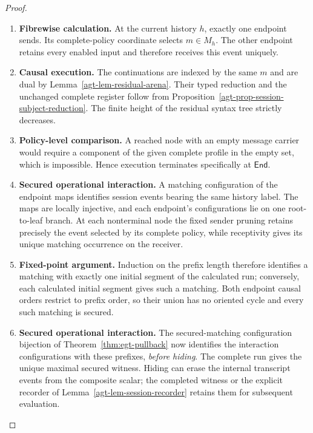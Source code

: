 \documentclass[11pt,a4paper]{article}
\numberwithin{equation}{section}
\theoremstyle{definition}
\theoremstyle{remark}
\theoremstyle{plain}
\providecommand{\End}{\mathsf{End}}
\begin{document}
\begin{proof}
\leavevmode
\begin{enumerate}[label=\textup{(\arabic*)},leftmargin=*,itemsep=4pt,topsep=3pt]
  \item \textbf{Fibrewise calculation.} At the current history $h$, exactly one endpoint sends. Its complete-policy
coordinate selects $m\in M_h$. The other endpoint retains every enabled
input and therefore receives this event uniquely.
  \item \textbf{Causal execution.} The continuations
are indexed by the same $m$ and are dual by
Lemma~\ref{agt-lem-residual-arena}. Their typed reduction and the
unchanged complete register follow from
Proposition~\ref{agt-prop-session-subject-reduction}. The finite height
of the residual syntax tree strictly decreases.
  \item \textbf{Policy-level comparison.} A reached node with an
empty message carrier would
require a component of the given complete profile in the empty set, which
is impossible. Hence execution terminates specifically at $\End$.
  \item \textbf{Secured operational interaction.} A matching configuration of the endpoint maps identifies session events
bearing the same history label. The maps are locally injective, and each
endpoint's configurations lie on one root-to-leaf branch. At each
nonterminal node the fixed sender pruning retains precisely the event
selected by its complete policy, while receptivity gives its unique
matching occurrence on the receiver.
  \item \textbf{Fixed-point argument.} Induction on the prefix length
therefore identifies a matching with exactly one initial segment of
the calculated run; conversely, each calculated initial segment gives
such a matching. Both endpoint causal orders restrict to prefix order,
so their union has no oriented cycle and every such matching is secured.
  \item \textbf{Secured operational interaction.} The secured-matching configuration bijection of
Theorem~\ref{thm:egt-pullback} now identifies the interaction
configurations with these prefixes, \emph{before hiding}. The complete
run gives the unique maximal secured witness. Hiding can erase the
internal transcript events from the composite scalar; the completed
witness or the explicit recorder of Lemma~\ref{agt-lem-session-recorder}
retains them for subsequent evaluation.
\end{enumerate}
\end{proof}
\end{document}

